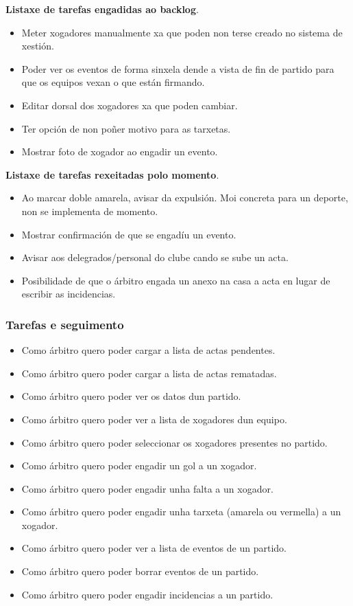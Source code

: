       \textbf{Listaxe de tarefas engadidas ao backlog}.
        \begin{itemize}
          \item Meter xogadores manualmente xa que poden non terse creado no 
sistema de xestión.
          \item Poder ver os eventos de forma sinxela dende a vista de fin de 
partido para que os equipos vexan o que están firmando.
         \item Editar dorsal dos xogadores xa que poden cambiar.
         \item Ter opción de non poñer motivo para as tarxetas.
         \item Mostrar foto de xogador ao engadir un evento.
        \end{itemize}

      \textbf{Listaxe de tarefas rexeitadas polo momento}.
        \begin{itemize}
         \item Ao marcar doble amarela, avisar da expulsión. Moi concreta para 
un deporte, non se implementa de momento.
         \item Mostrar confirmación de que se engadíu un evento.
         \item Avisar aos delegrados/personal do clube cando se sube un acta.
         \item Posibilidade de que o árbitro engada un anexo na casa a acta en 
lugar de escribir as incidencias.
        \end{itemize}


      \subsubsection{Tarefas e seguimento}

            \begin{itemize}
        \item Como árbitro quero poder cargar a lista de actas pendentes.
        \item Como árbitro quero poder cargar a lista de actas rematadas.
        \item Como árbitro quero poder ver os datos dun partido.
        \item Como árbitro quero poder ver a lista de xogadores dun equipo.
        \item Como árbitro quero poder seleccionar os xogadores presentes no 
partido.
        \item Como árbitro quero poder engadir un gol a un xogador.
        \item Como árbitro quero poder engadir unha falta a un xogador.
        \item Como árbitro quero poder engadir unha tarxeta (amarela ou 
vermella) a un xogador.
        \item Como árbitro quero poder ver a lista de eventos de un partido.
        \item Como árbitro quero poder borrar eventos de un partido.
        \item Como árbitro quero poder engadir incidencias a un partido.
       \end{itemize}




